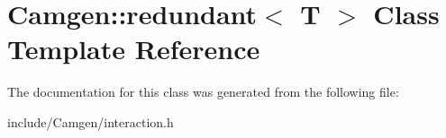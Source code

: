 \hypertarget{a00473}{}\section{Camgen\+:\+:redundant$<$ T $>$ Class Template Reference}
\label{a00473}


The documentation for this class was generated from the following file\+:\begin{DoxyCompactItemize}
\item 
include/\+Camgen/interaction.\+h\end{DoxyCompactItemize}
